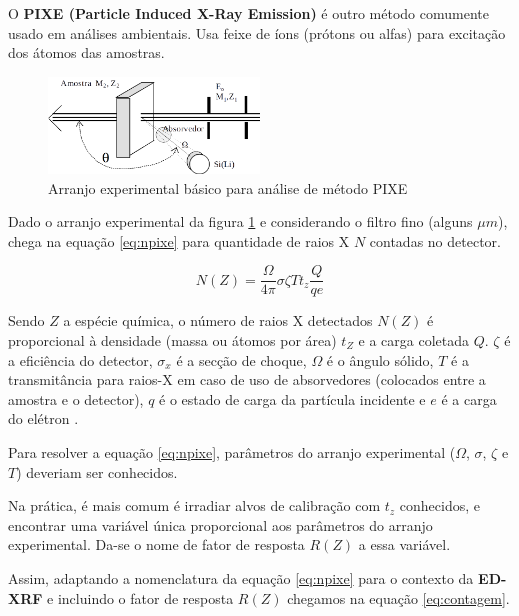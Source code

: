 O \textbf{PIXE (Particle Induced X-Ray Emission)} é
outro método comumente usado em análises ambientais. 
Usa feixe de íons (prótons ou alfas) para excitação dos 
átomos das amostras.

\begin{figure}[H]
\begin{center} 
  \includegraphics[width=0.5\textwidth]{../inputs/images/arranjopixe.png}
  \caption{Arranjo experimental básico para análise de método PIXE 
           \citep{tabacniks2000} \label{fig:arranjopixe}}
\end{center}
\end{figure}

Dado o arranjo experimental da figura \ref{fig:arranjopixe} e
considerando o filtro fino (alguns $\mu m$),
\citep{tabacniks2000} chega na equação \ref{eq:npixe} para 
quantidade de raios X $N$ contadas no detector. 

\begin{equation}
  \label{eq:npixe}
  N(Z) = \frac{\Omega}{4\pi} \sigma \zeta T t_z \frac{Q}{qe}
\end{equation}

Sendo $Z$ a espécie química, o número de raios X detectados 
$N(Z)$ é proporcional à densidade (massa ou átomos por área) $t_Z$ 
e a carga coletada $Q$.
$\zeta$ é a eficiência do detector, $\sigma_x$ é a secção de choque, 
$\Omega$ é o ângulo sólido, $T$ é a transmitância para raios-X em 
caso de uso de absorvedores (colocados entre a amostra e o detector), 
$q$ é o estado de carga da partícula incidente e 
$e$ é a carga do elétron \citep{tabacniks1983}.

Para resolver a equação \ref{eq:npixe}, parâmetros do arranjo experimental
($\Omega$, $\sigma$, $\zeta$ e $T$) deveriam ser conhecidos. 

Na prática, é mais comum é irradiar alvos de calibração com $t_z$ conhecidos,
e encontrar uma variável única proporcional aos parâmetros do arranjo experimental.
Da-se o nome de fator de resposta $R(Z)$ a essa variável.

Assim, adaptando a nomenclatura da equação \ref{eq:npixe} para o contexto 
da \textbf{ED-XRF} e incluindo o fator de resposta $R(Z)$ chegamos na equação 
\ref{eq:contagem}.

